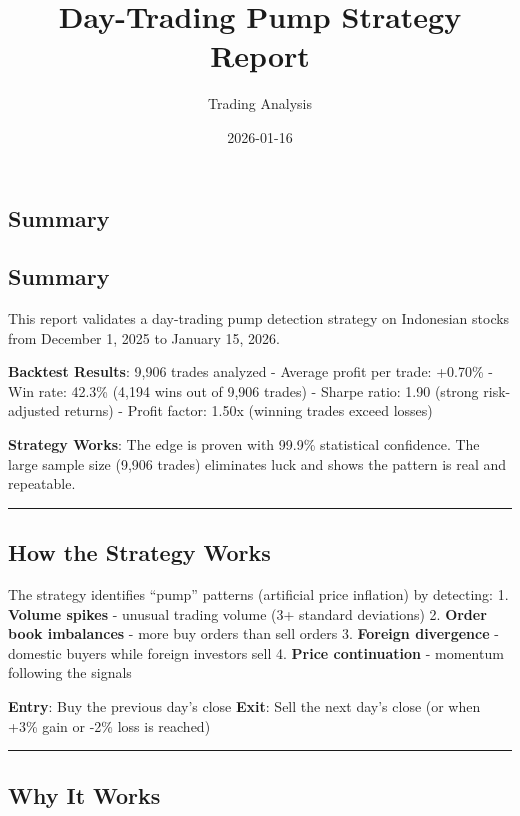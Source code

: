 \documentclass[
  11pt,
  letterpaper,
]{article}
\title{Day-Trading Pump Strategy Report}
\author{Trading Analysis}
\date{2026-01-16}
\begin{document}
\maketitle


\subsection{Summary}\label{summary}

\subsection{Summary}\label{summary-1}

This report validates a day-trading pump detection strategy on
Indonesian stocks from December 1, 2025 to January 15, 2026.

\textbf{Backtest Results}: 9,906 trades analyzed - Average profit per
trade: +0.70\% - Win rate: 42.3\% (4,194 wins out of 9,906 trades) -
Sharpe ratio: 1.90 (strong risk-adjusted returns) - Profit factor: 1.50x
(winning trades exceed losses)

\textbf{Strategy Works}: The edge is proven with 99.9\% statistical
confidence. The large sample size (9,906 trades) eliminates luck and
shows the pattern is real and repeatable.

\begin{center}\rule{0.5\linewidth}{0.5pt}\end{center}

\subsection{How the Strategy Works}\label{how-the-strategy-works}

The strategy identifies ``pump'' patterns (artificial price inflation)
by detecting: 1. \textbf{Volume spikes} - unusual trading volume (3+
standard deviations) 2. \textbf{Order book imbalances} - more buy orders
than sell orders 3. \textbf{Foreign divergence} - domestic buyers while
foreign investors sell 4. \textbf{Price continuation} - momentum
following the signals

\textbf{Entry}: Buy the previous day's close \textbf{Exit}: Sell the
next day's close (or when +3\% gain or -2\% loss is reached)

\begin{center}\rule{0.5\linewidth}{0.5pt}\end{center}

\subsection{Why It Works}\label{why-it-works}
\end{document}
